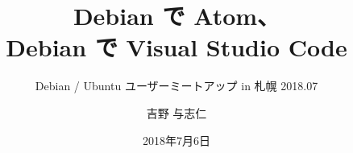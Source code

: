 




\documentclass[cjk,dvipdfmx,12pt]{beamer}
\usepackage{monthlypresentation}



\title{Debian で Atom、\\Debian で Visual Studio Code}
\subtitle{Debian / Ubuntu ユーザーミートアップ in 札幌 2018.07}
\author{吉野 与志仁}
\date{2018年7月6日}



